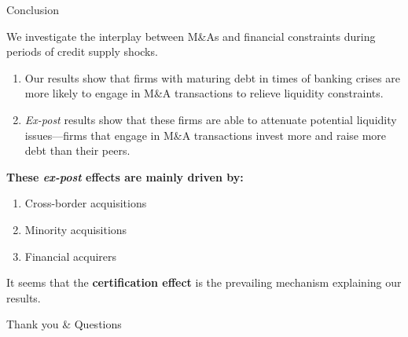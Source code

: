 \documentclass[10pt]{beamer}
\begin{document}
\begin{frame}{Conclusion}

We investigate the interplay between M\&As and financial constraints during periods of credit supply shocks.

\begin{enumerate}
\item Our results show that firms with maturing debt in times of banking crises are more likely to engage in M\&A transactions to relieve liquidity constraints.
    
\item \textit{Ex-post} results show that these firms are able to attenuate potential liquidity issues—firms that engage in M\&A transactions invest more and raise more debt than their peers.

\end{enumerate}

\textbf{These \textit{ex-post} effects are mainly driven by:}
\begin{enumerate}
        \item Cross-border acquisitions
        \item Minority acquisitions
        \item Financial acquirers %
        \end{enumerate}
It seems that the \textbf{certification effect} is the prevailing mechanism explaining our results.
\end{frame}


\begin{frame}{}

    \huge Thank you \& Questions\\
        \\~\\
    
\end{frame}
\end{document}

